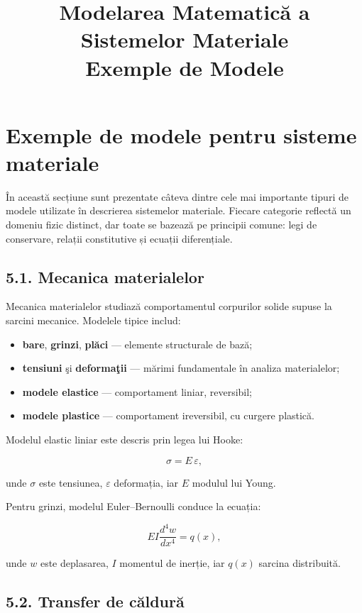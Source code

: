 \documentclass[12pt,a4paper]{article}
\title{Modelarea Matematică a Sistemelor Materiale \\ \large Exemple de Modele}
\author{}
\date{}
\begin{document}
\maketitle

\section{Exemple de modele pentru sisteme materiale}

În această secțiune sunt prezentate câteva dintre cele mai importante tipuri de modele utilizate în descrierea sistemelor materiale. Fiecare categorie reflectă un domeniu fizic distinct, dar toate se bazează pe principii comune: legi de conservare, relații constitutive și ecuații diferențiale.

\subsection{5.1. Mecanica materialelor}

Mecanica materialelor studiază comportamentul corpurilor solide supuse la sarcini mecanice. Modelele tipice includ:

\begin{itemize}
    \item \textbf{bare}, \textbf{grinzi}, \textbf{plăci} — elemente structurale de bază;
    \item \textbf{tensiuni} şi \textbf{deformaţii} — mărimi fundamentale în analiza materialelor;
    \item \textbf{modele elastice} — comportament liniar, reversibil;
    \item \textbf{modele plastice} — comportament ireversibil, cu curgere plastică.
\end{itemize}

Modelul elastic liniar este descris prin legea lui Hooke:


\[
\sigma = E \, \varepsilon,
\]


unde $\sigma$ este tensiunea, $\varepsilon$ deformația, iar $E$ modulul lui Young.

Pentru grinzi, modelul Euler–Bernoulli conduce la ecuația:


\[
EI \frac{d^4 w}{dx^4} = q(x),
\]


unde $w$ este deplasarea, $I$ momentul de inerție, iar $q(x)$ sarcina distribuită.

\subsection{5.2. Transfer de căldură}
\end{document}
